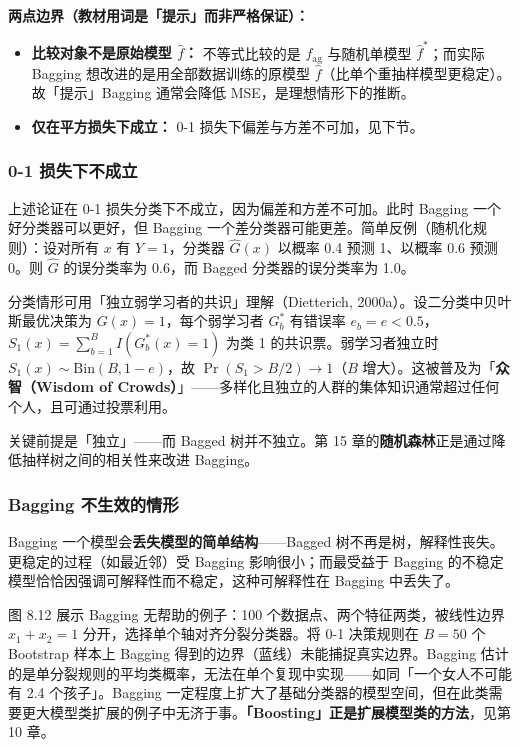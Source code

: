 \textbf{两点边界（教材用词是「提示」而非严格保证）：}
\begin{itemize}
    \item \textbf{比较对象不是原始模型 $\hat{f}$：} 不等式比较的是 $f_{\mathrm{ag}}$ 与随机单模型 $\hat{f}^*$；而实际 Bagging 想改进的是用全部数据训练的原模型 $\hat{f}$（比单个重抽样模型更稳定）。故「提示」Bagging 通常会降低 MSE，是理想情形下的推断。
    \item \textbf{仅在平方损失下成立：} 0-1 损失下偏差与方差不可加，见下节。
\end{itemize}

\subsubsection{0-1 损失下不成立}

上述论证在 0-1 损失分类下不成立，因为偏差和方差不可加。此时 Bagging 一个好分类器可以更好，但 Bagging 一个差分类器可能更差。简单反例（随机化规则）：设对所有 $x$ 有 $Y = 1$，分类器 $\hat{G}(x)$ 以概率 0.4 预测 1、以概率 0.6 预测 0。则 $\hat{G}$ 的误分类率为 0.6，而 Bagged 分类器的误分类率为 1.0。

分类情形可用「独立弱学习者的共识」理解（Dietterich, 2000a）。设二分类中贝叶斯最优决策为 $G(x) = 1$，每个弱学习者 $G_b^*$ 有错误率 $e_b = e < 0.5$，$S_1(x) = \sum_{b=1}^{B} I(G_b^*(x) = 1)$ 为类 1 的共识票。弱学习者独立时 $S_1(x) \sim \mathrm{Bin}(B, 1-e)$，故 $\Pr(S_1 > B/2) \to 1$（$B$ 增大）。这被普及为「\textbf{众智（Wisdom of Crowds）}」——多样化且独立的人群的集体知识通常超过任何个人，且可通过投票利用。

\begin{remark}
    关键前提是「独立」——而 Bagged 树并不独立。第 15 章的\textbf{随机森林}正是通过降低抽样树之间的相关性来改进 Bagging。
\end{remark}

\subsubsection{Bagging 不生效的情形}

Bagging 一个模型会\textbf{丢失模型的简单结构}——Bagged 树不再是树，解释性丧失。更稳定的过程（如最近邻）受 Bagging 影响很小；而最受益于 Bagging 的不稳定模型恰恰因强调可解释性而不稳定，这种可解释性在 Bagging 中丢失了。

图 8.12 展示 Bagging 无帮助的例子：100 个数据点、两个特征两类，被线性边界 $x_1 + x_2 = 1$ 分开，选择单个轴对齐分裂分类器。将 0-1 决策规则在 $B = 50$ 个 Bootstrap 样本上 Bagging 得到的边界（蓝线）未能捕捉真实边界。Bagging 估计的是单分裂规则的平均类概率，无法在单个复现中实现——如同「一个女人不可能有 2.4 个孩子」。Bagging 一定程度上扩大了基础分类器的模型空间，但在此类需要更大模型类扩展的例子中无济于事。\textbf{「Boosting」正是扩展模型类的方法}，见第 10 章。

